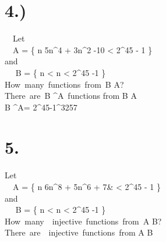 \documentclass{article}
\begin{document}
\section*{4.)}
~~Let \\ ~~A = \left\{ n \in {} \mid 5n^4 + 3n^2 -10 < 2^{45} - 1 \right\} \\ and \\~~ B = \left\{ n \in {}  < n < 2^{45} -1 \right\} \\ How~many~functions~from~B \rightarrow A?\\
There~are~\mid B \mid ^{\mid A\mid}~functions from B \rightarrow A\\
\mid B \mid ^{\mid A\mid}= 2^{45}-1^{3257} 

\section*{5.}
Let \\ ~~A = \left\{ n \in {} \mid 6n^8 + 5n^6 + 7& < 2^{45} - 1 \right\} \\ and \\~~ B = \left\{ n \in {}  < n < 2^{45} -1 \right\} \\ How~many~~injective~functions~from~A \rightarrow B?\\
There~are~~injective~functions~from A \rightarrow B
\end{document}
